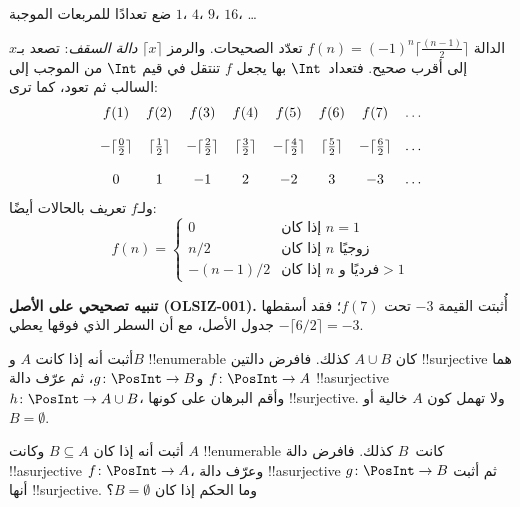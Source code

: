 \documentclass[../../../include/open-logic-section]{subfiles}
\begin{document}
\begin{prob}
ضع تعدادًا للمربعات الموجبة $1$، $4$، $9$، $16$، \dots
\end{prob}

\begin{ex}
الدالة $f(n) = (-1)^{n} \lceil \frac{(n-1)}{2}\rceil$ تعدّد
الصحيحات. والرمز $\lceil x \rceil$ \emph{دالة السقف}: تصعد بـ$x$
إلى أقرب صحيح. فتعداد~$\Int$ بها يجعل $f$ تنتقل في قيم $\Int$
من الموجب إلى السالب ثم تعود، كما ترى:
\[
\begin{array}{c c c c c c c c}
f(1) & f(2) & f(3) & f(4) & f(5) & f(6) & f(7) & \dots \\ \\
- \lceil \tfrac{0}{2} \rceil & \lceil \tfrac{1}{2}\rceil & - \lceil \tfrac{2}{2} \rceil & \lceil \tfrac{3}{2} \rceil & - \lceil \tfrac{4}{2} \rceil  & \lceil \tfrac{5}{2}
\rceil & - \lceil \tfrac{6}{2} \rceil & \dots \\ \\
0 & 1 & -1 & 2 & -2 & 3 & -3 & \dots
\end{array}
\]
ولـ$f$ تعريف بالحالات أيضًا:
\[
f(n) = \begin{cases}
  0 & \text{إذا كان $n = 1$}\\
  n/2 & \text{إذا كان $n$ زوجيًا}\\
  -(n-1)/2 & \text{إذا كان $n$ فرديًا و$>1$}
  \end{cases}
\]
\end{ex}

\begin{editorial}
\textbf{تنبيه تصحيحي على الأصل (OLSIZ-001).}
أُثبتت القيمة $-3$ تحت $f(7)$؛ فقد أسقطها جدول الأصل، مع أن
السطر الذي فوقها يعطي $-\lceil 6/2\rceil=-3$.
\end{editorial}

\begin{prob}
أثبت أنه إذا كانت $A$ و$B$ !!{enumerable} كان $A \cup B$ كذلك.
فافرض دالتين !!{surjective} هما $f\colon \PosInt \to A$ و$g\colon \PosInt \to B$،
ثم عرّف دالة !!a{surjective}~$h\colon \PosInt \to A \cup B$،
وأقم البرهان على كونها !!{surjective}. ولا تهمل كون $A$ خالية
أو~$B = \emptyset$.
\end{prob}

\begin{prob}
أثبت أنه إذا كان $B \subseteq A$ وكانت $A$ !!{enumerable} كانت~$B$ كذلك.
فافرض دالة !!a{surjective} $f\colon \PosInt \to A$،
وعرّف دالة !!a{surjective} $g\colon \PosInt \to B$ ثم أثبت أنها
!!{surjective}. وما الحكم إذا كان $B = \emptyset$؟
\end{prob}
\end{document}
